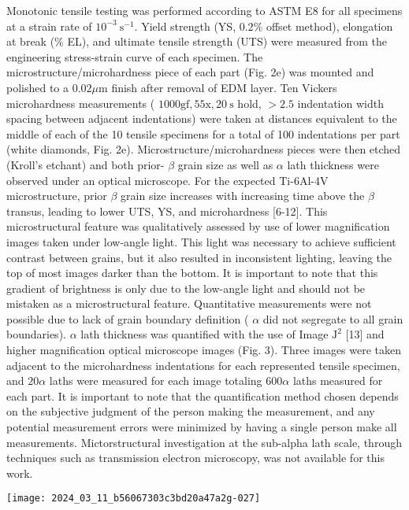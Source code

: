 \documentclass[10pt]{article}
\begin{document}
Monotonic tensile testing was performed according to ASTM E8 for all specimens at a strain rate of $10^{-3} \mathrm{~s}^{-1}$. Yield strength (YS, $0.2 \%$ offset method), elongation at break (\% EL), and ultimate tensile strength (UTS) were measured from the engineering stress-strain curve of each specimen. The microstructure/microhardness piece of each part (Fig. 2e) was mounted and polished to a $0.02 \mu \mathrm{m}$ finish after removal of EDM layer. Ten Vickers microhardness measurements ( $1000 \mathrm{gf}, 55 \mathrm{x}, 20 \mathrm{~s}$ hold, $>2.5$ indentation width spacing between adjacent indentations) were taken at distances equivalent to the middle of each of the 10 tensile specimens for a total of 100 indentations per part (white diamonds, Fig. 2e). Microstructure/microhardness pieces were then etched (Kroll's etchant) and both prior- $\beta$ grain size as well as $\alpha$ lath thickness were observed under an optical microscope. For the expected Ti-6Al-4V microstructure, prior $\beta$ grain size increases with increasing time above the $\beta$ transus, leading to lower UTS, YS, and microhardness [6-12]. This microstructural feature was qualitatively assessed by use of lower magnification images taken under low-angle light. This light was necessary to achieve sufficient contrast between grains, but it also resulted in inconsistent lighting, leaving the top of most images darker than the bottom. It is important to note that this gradient of brightness is only due to the low-angle light and should not be mistaken as a microstructural feature. Quantitative measurements were not possible due to lack of grain boundary definition ( $\alpha$ did not segregate to all grain boundaries). $\alpha$ lath thickness was quantified with the use of Image $\mathrm{J}^{2}$ [13] and higher magnification optical microscope images (Fig. 3). Three images were taken adjacent to the microhardness indentations for each represented tensile specimen, and $20 \alpha$ laths were measured for each image totaling $600 \alpha$ laths measured for each part. It is important to note that the quantification method chosen depends on the subjective judgment of the person making the measurement, and any potential measurement errors were minimized by having a single person make all measurements. Mictorstructural investigation at the sub-alpha lath scale, through techniques such as transmission electron microscopy, was not available for this work.

\begin{center}
\texttt{[image: 2024\_03\_11\_b56067303c3bd20a47a2g-027]}
\end{center}
\end{document}
